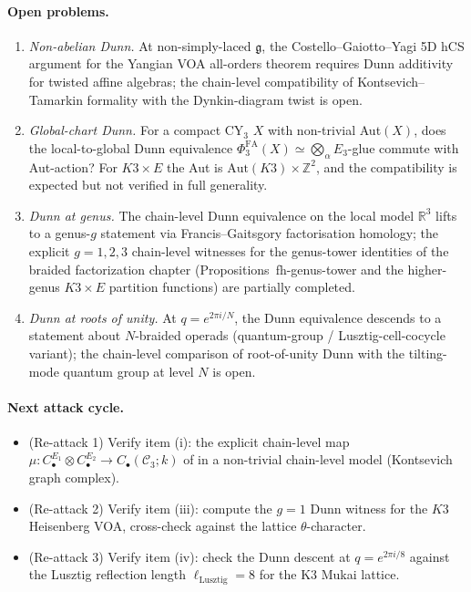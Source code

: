 \documentclass[11pt]{article}
\newcommand{\Cube}{\mathscr{C}}
\newcommand{\R}{\mathbb{R}}
\newcommand{\Z}{\mathbb{Z}}
\newcommand{\PhiFA}{\Phi^{\mathrm{FA}}}
\newcommand{\frakg}{\mathfrak{g}}
\begin{document}
\paragraph{Open problems.}
\begin{enumerate}[label=(\roman*), leftmargin=*]
  \item \emph{Non-abelian Dunn.} At non-simply-laced $\frakg$, the
    Costello--Gaiotto--Yagi 5D hCS argument for the
    Yangian VOA all-orders theorem requires Dunn additivity for twisted
    affine algebras; the chain-level compatibility of Kontsevich--Tamarkin
    formality with the Dynkin-diagram twist is open.
  \item \emph{Global-chart Dunn.} For a compact CY$_{3}$ $X$ with
    non-trivial Aut$(X)$, does the local-to-global Dunn equivalence
    $\PhiFA_{3}(X) \simeq \bigotimes_{\alpha} E_{3}$-glue commute with
    Aut-action? For $K3 \times E$ the Aut is $\mathrm{Aut}(K3) \times
    \Z^{2}$, and the compatibility is expected but not verified in full
    generality.
  \item \emph{Dunn at genus.} The chain-level Dunn equivalence on the
    local model $\R^{3}$ lifts to a genus-$g$ statement via
    Francis--Gaitsgory factorisation homology; the explicit
    $g = 1, 2, 3$ chain-level witnesses for the genus-tower identities
    of the braided factorization chapter (Propositions~fh-genus-tower
    and the higher-genus $K3 \times E$ partition functions) are partially
    completed.
  \item \emph{Dunn at roots of unity.} At $q = e^{2\pi i / N}$, the
    Dunn equivalence descends to a statement about $N$-braided operads
    (quantum-group / Lusztig-cell-cocycle variant); the chain-level
    comparison of root-of-unity Dunn with the tilting-mode quantum
    group at level $N$ is open.
\end{enumerate}

\paragraph{Next attack cycle.}
\begin{itemize}[leftmargin=*]
  \item (Re-attack 1) Verify item (i): the explicit chain-level map
    $\mu \colon C_{\bullet}^{E_{1}} \otimes C_{\bullet}^{E_{2}} \to
    C_{\bullet}(\Cube_{3}; k)$ of  in a
    non-trivial chain-level model (Kontsevich graph complex).
  \item (Re-attack 2) Verify item (iii): compute the $g = 1$ Dunn
    witness for the $K3$ Heisenberg VOA, cross-check against the lattice
    $\theta$-character.
  \item (Re-attack 3) Verify item (iv): check the Dunn descent at
    $q = e^{2\pi i / 8}$ against the Lusztig reflection length
    $\ell_{\mathrm{Lusztig}} = 8$ for the K3 Mukai lattice.
\end{itemize}
\end{document}
